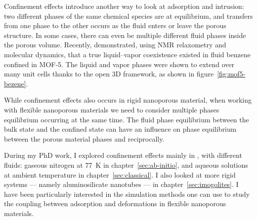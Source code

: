 \documentclass[thesis]{subfiles}
\begin{document}
Confinement effects introduce another way to look at adsorption and intrusion:
two different phases of the same chemical species are at equilibrium, and
transfers from one phase to the other occurs as the fluid enters or leave the
porous structure. In some cases, there can even be multiple different fluid
phases inside the porous volume. Recently,
\citeauthor{Braun2015}\cite{Braun2015} demonstrated, using NMR relaxometry and
molecular dynamics, that a true liquid–vapor coexistence existed in fluid
benzene confined in MOF-5. The liquid and vapor phases were shown to extend over
many unit cells thanks to the open 3D framework, as shown in
figure~\ref{fig:mof5-bezene}.

While confinement effects also occurs in rigid nanoporous material, when working
with flexible nanoporous materials we need to consider multiple phases
equilibrium occurring at the same time. The fluid phase equilibrium between the
bulk state and the confined state can have an influence on phase equilibrium
between the porous material phases and reciprocally.

During my PhD work, I explored confinement effects mainly in , with
different fluids: gaseous nitrogen at \SI{77}{K} in chapter~\ref{sec:ab-initio},
and aqueous solutions at ambient temperature in chapter~\ref{sec:classical}. I
also looked at more rigid systems --- namely aluminosilicate nanotubes --- in
chapter~\ref{sec:imogolites}. I have been particularly interested in the
simulation methods one can use to study the coupling between adsorption and
deformations in flexible nanoporous materials.
\newpage

\OnlyInSubfile{\printglobalbibliography}
\end{document}
